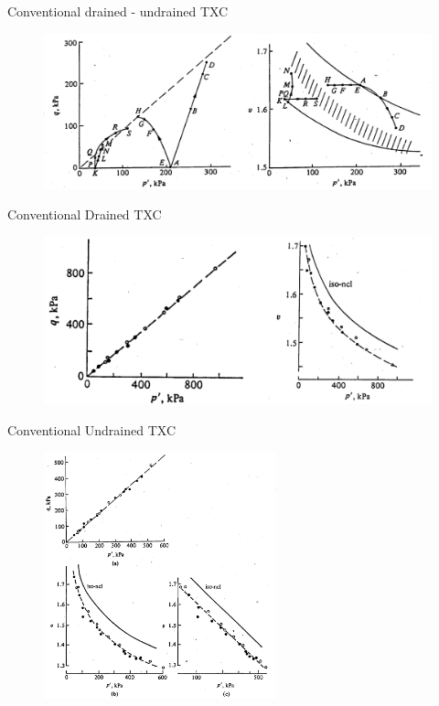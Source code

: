 \documentclass[notes]{beamer}
\begin{document}
\begin{frame}{Conventional drained - undrained TXC}
	\begin{figure}
		\includegraphics[width=\textwidth]{figs/conventional-drained-undrained.png}
	\end{figure}
\end{frame}

\begin{frame}{Conventional Drained TXC}
	\begin{figure}
		\includegraphics[width=\textwidth]{figs/p-q-v-drained_weald-clay.png}
	\end{figure}
\end{frame}

\begin{frame}{Conventional Undrained TXC}
	\begin{figure}
		\includegraphics[width=0.6\textwidth]{figs/p-q-v-undrained-weald.png}
	\end{figure}
\end{frame}
\end{document}

